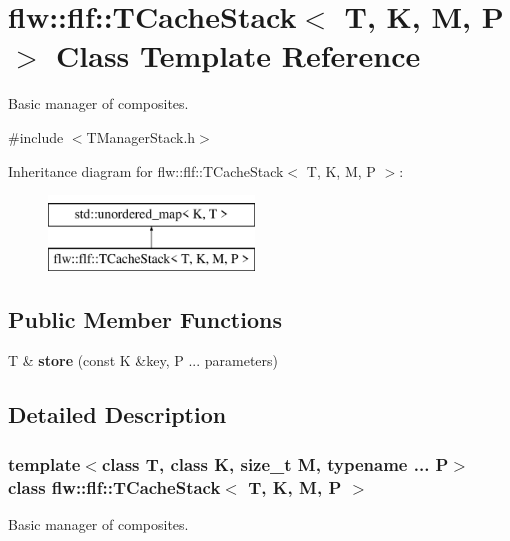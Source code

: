 \hypertarget{classflw_1_1flf_1_1TCacheStack}{}\section{flw\+:\+:flf\+:\+:T\+Cache\+Stack$<$ T, K, M, P $>$ Class Template Reference}
\label{classflw_1_1flf_1_1TCacheStack}


Basic manager of composites.  




{\ttfamily \#include $<$T\+Manager\+Stack.\+h$>$}

Inheritance diagram for flw\+:\+:flf\+:\+:T\+Cache\+Stack$<$ T, K, M, P $>$\+:\begin{figure}[H]
\begin{center}
\leavevmode
\includegraphics[height=2.000000cm]{classflw_1_1flf_1_1TCacheStack}
\end{center}
\end{figure}
\subsection*{Public Member Functions}
\begin{DoxyCompactItemize}
\item 
\mbox{\label{classflw_1_1flf_1_1TCacheStack_a1453accabc1d0759558bab1dec255c6b}} 
T \& {\bfseries store} (const K \&key, P ... parameters)
\end{DoxyCompactItemize}


\subsection{Detailed Description}
\subsubsection*{template$<$class T, class K, size\+\_\+t M, typename ... P$>$\newline
class flw\+::flf\+::\+T\+Cache\+Stack$<$ T, K, M, P $>$}

Basic manager of composites. 


